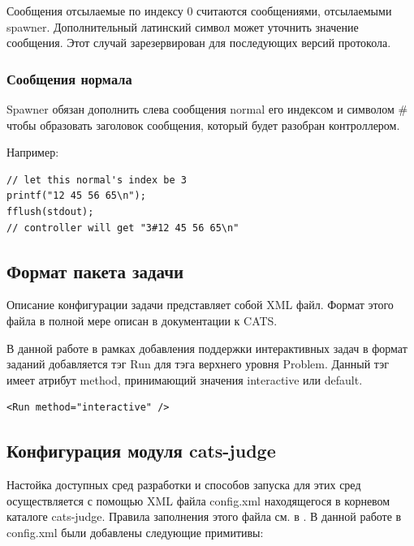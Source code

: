 \documentclass{imcs}
\begin{document}
Сообщения отсылаемые по индексу 0 считаются сообщениями, отсылаемыми spawner. Дополнительный латинский символ может уточнить значение сообщения. Этот случай зарезервирован для последующих версий протокола.

\subsubsection{Сообщения нормала}
Spawner обязан дополнить слева сообщения normal его индексом и символом \# чтобы образовать заголовок сообщения, который будет разобран контроллером.

Например:
\begin{lstlisting}
// let this normal's index be 3
printf("12 45 56 65\n");
fflush(stdout);
// controller will get "3#12 45 56 65\n"
\end{lstlisting}

\subsection{Формат пакета задачи}
Описание конфигурации задачи представляет собой XML файл. Формат этого файла в полной мере описан в документации к CATS. \cite{catsprobformat}

В данной работе в рамках добавления поддержки интерактивных задач в формат заданий добавляется тэг Run для тэга верхнего уровня Problem. Данный тэг имеет атрибут method, принимающий значения interactive или default.

\begin{lstlisting}
<Run method="interactive" />
\end{lstlisting}

\subsection{Конфигурация модуля cats-judge}
Настойка доступных сред разработки и способов запуска для этих сред осуществляется с помощью XML файла config.xml находящегося в корневом каталоге cats-judge. Правила заполнения этого файла см. в \cite{rozhkov}. В данной работе в config.xml были добавлены следующие примитивы:
\end{document}
